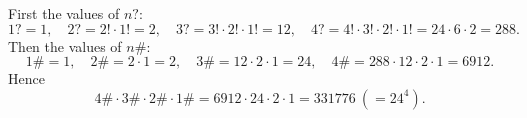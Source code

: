 First the values of $n?$:
\[
1?=1,\quad 2?=2!\cdot1!=2,\quad 3?=3!\cdot2!\cdot1!=12,\quad 4?=4!\cdot3!\cdot2!\cdot1!=24\cdot6\cdot2=288 .
\]
Then the values of $n\#$:
\[
1\#=1,\quad 2\#=2\cdot1=2,\quad 3\#=12\cdot2\cdot1=24,\quad 4\#=288\cdot12\cdot2\cdot1=6912 .
\]
Hence
\[
4\#\cdot3\#\cdot2\#\cdot1\#=6912\cdot24\cdot2\cdot1=\boxed{331776}\ \left(=24^4\right).
\]
